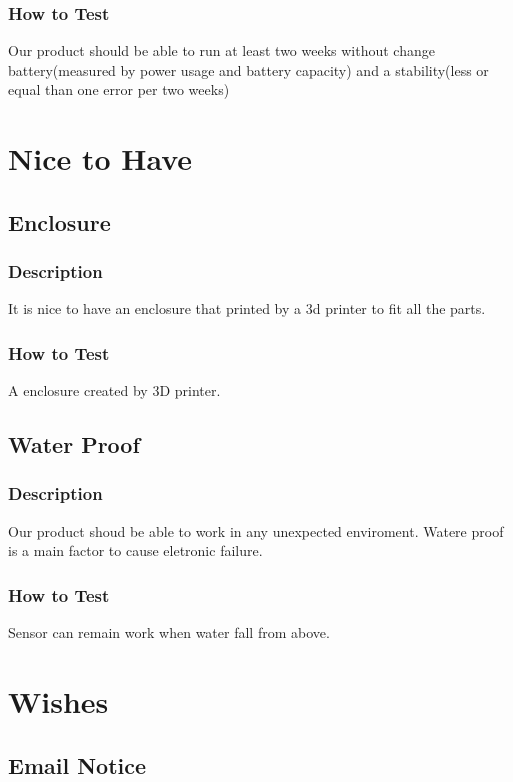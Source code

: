 \documentclass[letterpaper,12pt,notitlepage]{article}
\begin{document}
		\subsubsection{How to Test}
			\par Our product should be able to run at least two weeks without change battery(measured by power usage and battery capacity)
			and a stability(less or equal than one error per two weeks)


\section{Nice to Have}
	\subsection{Enclosure}
		\subsubsection{Description}
			\par It is nice to have an enclosure that printed by a 3d printer to fit all the parts. 
		\subsubsection{How to Test}
			\par A enclosure created by 3D printer. 

	\subsection{Water Proof}
		\subsubsection{Description}
			\par Our product shoud be able to work in any unexpected enviroment. Watere proof is a main factor to 
			cause eletronic failure. 
		\subsubsection{How to Test}
			\par Sensor can remain work when water fall from above. 

\section{Wishes}

	\subsection{Email Notice}
\end{document}

